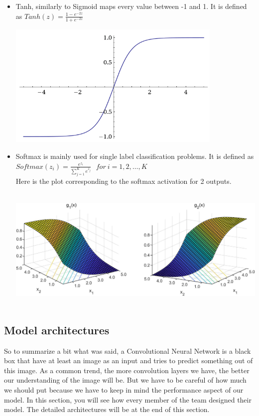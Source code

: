 \documentclass[12pt]{article}
\begin{document}
\begin{itemize}
\item Tanh, similarly to Sigmoid maps every value between -1 and 1. It is defined as $ Tanh(z) = \frac{1 - e^{-2z}}{1 + e^{-2z}}$ \\
\centerline{\includegraphics[height=6cm]{../../docs/tanh.png}}

\item Softmax is mainly used for single label classification problems. It is defined as $ Softmax(z_i) = \frac{e^{z_{i}}}{\sum_{j=1}^K e^{z_{j}}} \ \ \ for\ i=1,2,\dots,K$ \\
Here is the plot corresponding to the softmax activation for 2 outputs. \\
\centerline{\includegraphics[height=6cm]{../../docs/softmax.png}}

\end{itemize}

\subsection{Model architectures}

So to summarize a bit what was said, a Convolutional Neural Network is a black box that have at least an image as an input and tries to predict something out of this image. As a common trend, the more convolution layers we have, the better our understanding of the image will be. But we have to be careful of how much we should put because we have to keep in mind the performance aspect of our model. In this section, you will see how every member of the team designed their model. The detailed architectures will be at the end of this section. \\
\end{document}
